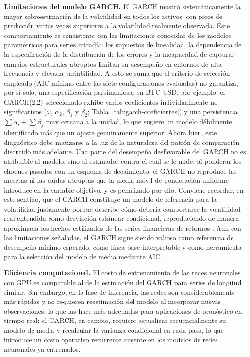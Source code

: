 \documentclass[12pt]{paper}
\begin{document}
\textbf{Limitaciones del modelo GARCH.} El GARCH mostró sistemáticamente la mayor sobreestimación de la volatilidad en todos los activos, con picos de predicción varias veces superiores a la volatilidad realmente observada. Este comportamiento es consistente con las limitaciones conocidas de los modelos paramétricos para series intradía: los supuestos de linealidad, la dependencia de la especificación de la distribución de los errores y la incapacidad de capturar cambios estructurales abruptos limitan su desempeño en entornos de alta frecuencia y elevada variabilidad. A esto se suma que el criterio de selección empleado (AIC mínimo entre las siete configuraciones evaluadas) no garantiza, por sí solo, una especificación parsimoniosa: en BTC-USD, por ejemplo, el GARCH(2,2) seleccionado exhibe varios coeficientes individualmente no significativos ($\omega$, $\alpha_2$, $\beta_1$ y $\beta_2$; Tabla~\ref{tab:garch-coeficientes}) y una persistencia $\sum \alpha_i + \sum \beta_j$ muy cercana a la unidad, lo que sugiere un modelo débilmente identificado más que un ajuste genuinamente superior. Ahora bien, este diagnóstico debe matizarse a la luz de la naturaleza del patrón de comparación discutido más adelante. Una parte del desempeño desfavorable del GARCH no es atribuible al modelo, sino al estimador contra el cual se le mide: al ponderar los choques pasados con un esquema de decaimiento, el GARCH no reproduce las mesetas ni las caídas abruptas que la media móvil de ponderación uniforme introduce en la variable objetivo, y es penalizado por ello. Conviene recordar, en este sentido, que el GARCH constituye un modelo de referencia para la volatilidad justamente porque describe cómo debería comportarse la volatilidad real entendida como desviación estándar condicional, reproduciendo de manera aproximada los hechos estilizados de las series financieras de retornos \citep{mcneil2015qrm}. Aun con las limitaciones señaladas, el GARCH sigue siendo valioso como referencia de desempeño mínimo esperado, como línea base interpretable y como herramienta para la selección del modelo de media mediante AIC.

\textbf{Eficiencia computacional.} El costo de entrenamiento de las redes neuronales con GPU es comparable al de la estimación del GARCH para series de longitud similar. Sin embargo, en la fase de inferencia, las redes son considerablemente más rápidas y no requieren reestimación del modelo al incorporar nuevas observaciones, lo que las hace más adecuadas para aplicaciones de pronóstico en tiempo real; el GARCH, en cambio, requiere actualizar secuencialmente su modelo de media y recalcular la varianza condicional en cada paso, lo que introduce un costo operativo recurrente ausente en los modelos de redes neuronales ya entrenados.
\end{document}

